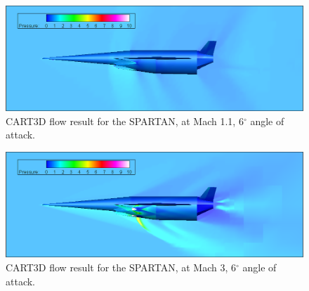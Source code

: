 		
		
		\begin{figure}
			\centering
			\includegraphics[width=0.9\linewidth]{figures/3_vehicle_design/M1p1AoA6}
			\caption{CART3D flow result for the SPARTAN, at Mach 1.1, 6$^\circ$ angle of attack.}
			\label{fig:M1}
		\end{figure}
		\begin{figure}
			\centering
			\includegraphics[width=0.9\linewidth]{figures/3_vehicle_design/M3AoA6}
			\caption{CART3D flow result for the SPARTAN, at Mach 3, 6$^\circ$ angle of attack.}
			\label{fig:M3AoA6}
		\end{figure}